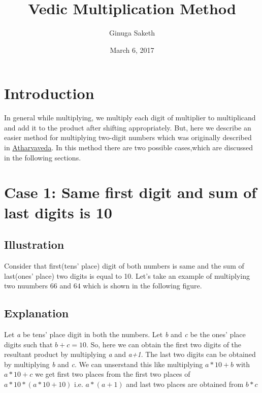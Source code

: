 \documentclass{article}
\title{\LARGE{Vedic Multiplication Method } }
\date{March 6, 2017}
\author{Ginuga Saketh}
\begin{document}
\maketitle

\section{\Large{Introduction}}
\hfill In general while multiplying, we multiply each digit of multiplier to multiplicand and add it to the product after shifting appropriately.
But, here we describe an easier method for multiplying two-digit numbers which was originally described in \href{https://en.wikipedia.org/wiki/Atharvaveda}{Atharvaveda}.
In this method there are two possible cases,which are discussed in the following sections.

\section{\Large{Case 1: }\large{Same first digit and sum of last digits is 10}}
\subsection{\large{Illustration}}
\hfill Consider that first(tens' place) digit of both numbers is same
and the sum of last(ones' place) two digits is equal to 10.
Let's take an example of multiplying two nuumbers $66$ and $64$ which is shown in the following figure.
\hfill \break
\subsection{\large{Explanation}}
\hspace{3mm} Let \textit{a} be tens' place digit in both the numbers.
Let \textit{b} and \textit{c} be the ones' place digits such that $b + c = 10$. 
So, here we can obtain the first two digits of the resultant product by multiplying \textit{a} and \textit{a+1}.
The last two digits can be obtained by multiplying \textit{b} and \textit{c}. We can unserstand this like multiplying $a*10+b$ with $a*10+c$ we get first two places
from the first two places of $a*10*(a*10+10)$ i.e. $a*(a+1)$ and last two places are obtained from $b*c$
\end{document}
